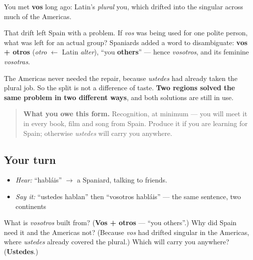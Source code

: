 \begin{cousinweb}
You met \textbf{vos} long ago: Latin's \emph{plural} you, which drifted into the singular across much of the Americas.

That drift left Spain with a problem. If \emph{vos} was being used for one polite person, what was left for an actual group? Spaniards added a word to disambiguate: \textbf{vos + otros} (\emph{otro} $\leftarrow$ Latin \emph{alter}), \textquotedblleft{}you \textbf{others}\textquotedblright{} — hence \emph{vosotros}, and its feminine \emph{vosotras}.

The Americas never needed the repair, because \emph{ustedes} had already taken the plural job. So the split is not a difference of taste. \textbf{Two regions solved the same problem in two different ways}, and both solutions are still in use.

\begin{quote}
\textbf{What you owe this form.} Recognition, at minimum — you will meet it in every book, film and song from Spain. Produce it if you are learning for Spain; otherwise \emph{ustedes} will carry you anywhere.
\end{quote}
\end{cousinweb}

\subsection*{Your turn}
\begin{itemize}
\raggedright
  \item \emph{Hear:} \textquotedblleft{}habláis\textquotedblright{} $\to$ a Spaniard, talking to friends.
  \item \emph{Say it:} \textquotedblleft{}ustedes hablan\textquotedblright{} then \textquotedblleft{}vosotros habláis\textquotedblright{} — the same sentence, two continents
\end{itemize}

\begin{tcolorbox}[breakable,colback=teal!4,colframe=teal!35!black,title={Before you move on}]
What is \emph{vosotros} built from? (\textbf{Vos + otros} — \textquotedblleft{}you others\textquotedblright{}.) Why did Spain need it and the Americas not? (Because \emph{vos} had drifted singular in the Americas, where \emph{ustedes} already covered the plural.) Which will carry you anywhere? (\textbf{Ustedes}.)
\end{tcolorbox}
